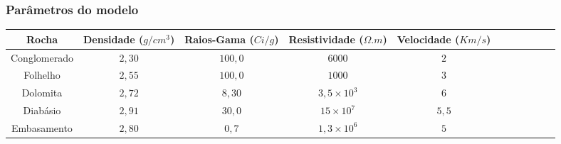\documentclass[aspectratio=10]{beamer} %
\begin{document}

\begin{frame}
\frametitle{Parâmetros do modelo}
\begin{scriptsize}
\begin{table}[H]
\centering
\label{parametros}
\begin{tabular}{@{}ccccccccccc@{}}
\toprule
Rocha        & Densidade ($g/cm^{3}$) & Raios-Gama ($Ci/g$) & Resistividade ($\Omega .m$)&  Velocidade ($Km/s$) &\\ \midrule
Conglomerado &       $2,30$ 		  &       $100,0$       &           $6000$           &			$2$   		   	&\\
Folhelho 	 &       $2,55$           &       $100,0$       &           $1000$           &     		$3$		 &\\
Dolomita     &       $2,72$           &       $8,30$        &           $3,5 \times 10^{3}$           &  	$6$    			 &\\
Diabásio     &       $2,91$           &       $30,0$        &           $15 \times 10^{7}$           &      $5,5$				 &\\
Embasamento  &       $2,80$           &       $0,7$         &           $1,3 \times 10^{6}$           & 		$5$		     &\\ \bottomrule
\end{tabular}
\end{table}
\end{scriptsize}

\end{frame}
\end{document}
